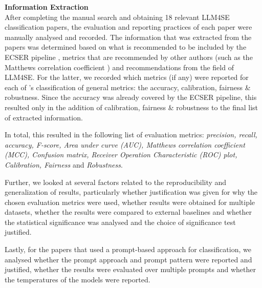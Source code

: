 \documentclass[a4paper]{article}
\begin{document}
\textbf{Information Extraction}\\
After completing the manual search and obtaining 18 relevant LLM4SE classification papers, the evaluation and reporting practices of each paper were manually analysed and recorded. The information that was extracted from the papers was determined based on what is recommended to be included by the ECSER pipeline \cite{Dellanna2022}, metrics that are recommended by other authors (such as the Matthews correlation coefficient \cite{Chicco2020,Foody2023,Yao2020}) and recommendations from the field of LLM4SE. For the latter, we recorded which metrics (if any) were reported for each of \textcite{chang2023}'s classification of general metrics: the accuracy, calibration, fairness \& robustness. Since the accuracy was already covered by the ECSER pipeline, this resulted only in the addition of calibration, fairness \& robustness to the final list of extracted information.

In total, this resulted in the following list of evaluation metrics: \textit{precision, recall, accuracy, F-score, Area under curve (AUC), Matthews correlation coefficient (MCC), Confusion matrix, Receiver Operation Characteristic (ROC) plot, Calibration, Fairness} and \textit{Robustness}.

Further, we looked at several factors related to the reproducibility and generalization of results, particularly whether justification was given for why the chosen evaluation metrics were used, whether results were obtained for multiple datasets, whether the results were compared to external baselines and whether the statistical significance was analysed and the choice of significance test justified. 

Lastly, for the papers that used a prompt-based approach for classification, we analysed whether the prompt approach and prompt pattern were reported and justified, whether the results were evaluated over multiple prompts and whether the temperatures of the models were reported.
\end{document}
